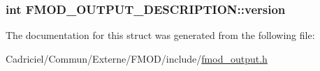 \hypertarget{struct_f_m_o_d___o_u_t_p_u_t___d_e_s_c_r_i_p_t_i_o_n_a1ffa1ceb39e6b22a0887819f479cbdd9}{
\subsubsection[{version}]{ {\bf int} F\-M\-O\-D\-\_\-\-O\-U\-T\-P\-U\-T\-\_\-\-D\-E\-S\-C\-R\-I\-P\-T\-I\-O\-N\-::version}}\label{struct_f_m_o_d___o_u_t_p_u_t___d_e_s_c_r_i_p_t_i_o_n_a1ffa1ceb39e6b22a0887819f479cbdd9}


The documentation for this struct was generated from the following file\-:\begin{DoxyCompactItemize}
\item 
Cadriciel/\-Commun/\-Externe/\-F\-M\-O\-D/include/\hyperlink{fmod__output_8h}{fmod\-\_\-output.\-h}\end{DoxyCompactItemize}
